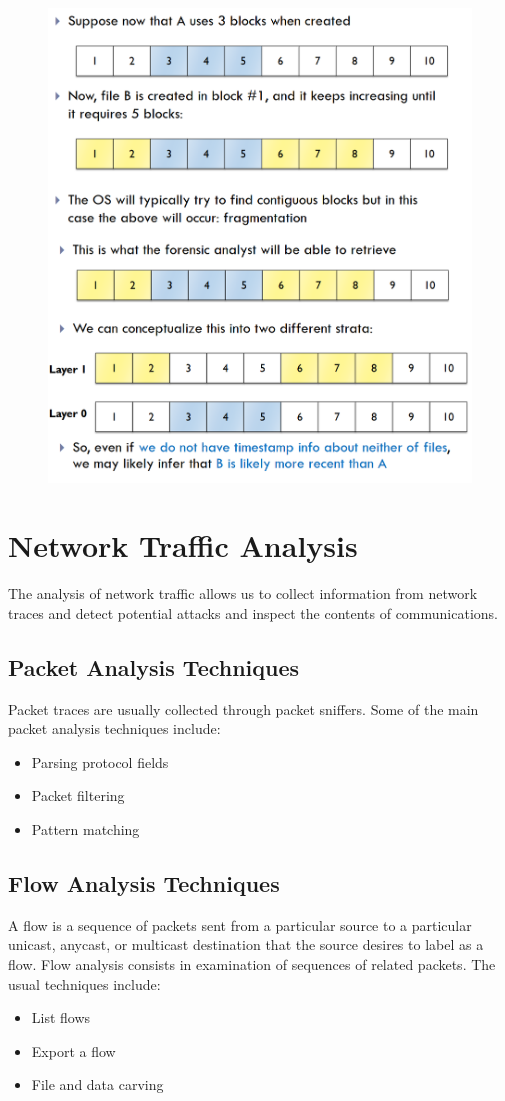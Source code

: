 \documentclass[10pt,a4paper]{report}
\begin{document}
\begin{itemize}
\begin{figure}[H]
\includegraphics[scale=0.3]{19.png}
\end{figure}
\end{itemize}
\section{Network Traffic Analysis}
The analysis of network traffic allows us to collect information from network traces and detect potential attacks and inspect the contents of communications.
\subsection{Packet Analysis Techniques}
Packet traces are usually collected through packet sniffers. Some of the main packet analysis techniques include:
\begin{itemize}
\item Parsing protocol fields
\item Packet filtering
\item Pattern matching
\end{itemize}
\subsection{Flow Analysis Techniques}
A flow is a sequence of packets sent from a particular source to a particular unicast, anycast, or multicast destination that the source desires to label as a flow. Flow analysis consists in examination of sequences of related packets. The usual techniques include:
\begin{itemize}
\item List flows
\item Export a flow
\item File and data carving
\end{itemize}
\end{document}
